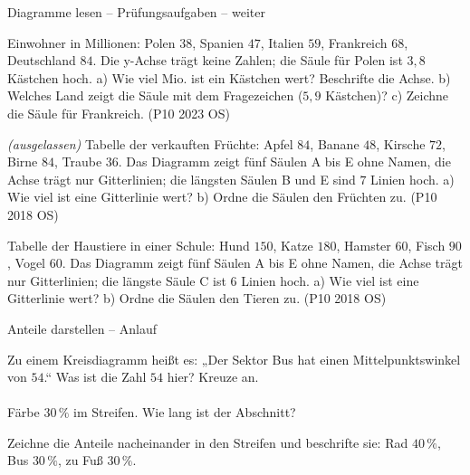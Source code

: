 \begin{aufgabe}{Diagramme lesen – Prüfungsaufgaben – weiter}
\begin{teile}
\teil Einwohner in Millionen: Polen $38$, Spanien $47$, Italien $59$, Frankreich $68$, Deutschland $84$. Die y-Achse trägt keine Zahlen; die Säule für Polen ist $3{,}8$ Kästchen hoch. a) Wie viel Mio. ist ein Kästchen wert? Beschrifte die Achse. b) Welches Land zeigt die Säule mit dem Fragezeichen ($5{,}9$ Kästchen)? c) Zeichne die Säule für Frankreich. \hfill (P10 2023 OS)

% 
\teil \textit{(ausgelassen)}
\teil Tabelle der verkauften Früchte: Apfel $84$, Banane $48$, Kirsche $72$, Birne $84$, Traube $36$. Das Diagramm zeigt fünf Säulen A bis E ohne Namen, die Achse trägt nur Gitterlinien; die längsten Säulen B und E sind $7$ Linien hoch. a) Wie viel ist eine Gitterlinie wert? b) Ordne die Säulen den Früchten zu. \hfill (P10 2018 OS)

\teil Tabelle der Haustiere in einer Schule: Hund $150$, Katze $180$, Hamster $60$, Fisch $90$, Vogel $60$. Das Diagramm zeigt fünf Säulen A bis E ohne Namen, die Achse trägt nur Gitterlinien; die längste Säule C ist $6$ Linien hoch. a) Wie viel ist eine Gitterlinie wert? b) Ordne die Säulen den Tieren zu. \hfill (P10 2018 OS)

\end{teile}
\end{aufgabe}

\begin{aufgabe}{Anteile darstellen – Anlauf}
\begin{teile}
\teil Zu einem Kreisdiagramm heißt es: „Der Sektor Bus hat einen Mittelpunktswinkel von $54$.“ Was ist die Zahl $54$ hier? Kreuze an.\\  \\ 
\teil Färbe $30\,\%$ im Streifen. Wie lang ist der Abschnitt?

\streifenleer
\leerfeld[cm]
\teil Zeichne die Anteile nacheinander in den Streifen und beschrifte sie: Rad $40\,\%$, Bus $30\,\%$, zu Fuß $30\,\%$.

\streifenleer[0]
\end{teile}
\end{aufgabe}

